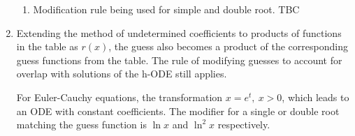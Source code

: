 \begin{enumerate}
\begin{enumerate}
              \item Modification rule being used for simple and double root. TBC

          \end{enumerate}
    \item Extending the method of undetermined coefficients to products of functions
          in the table as $ r(x) $, the guess also becomes a product of the corresponding
          guess functions from the table. The rule of modifying guesses to account for
          overlap with solutions of the h-ODE still applies. \par

          For Euler-Cauchy equations, the transformation $ x = e^{t},\ x>0 $, which leads
          to an ODE with constant coefficients. The modifier for a single or double root
          matching the guess function is $\ln x $ and $ \ln^{2} x$ respectively. \par


\end{enumerate}
